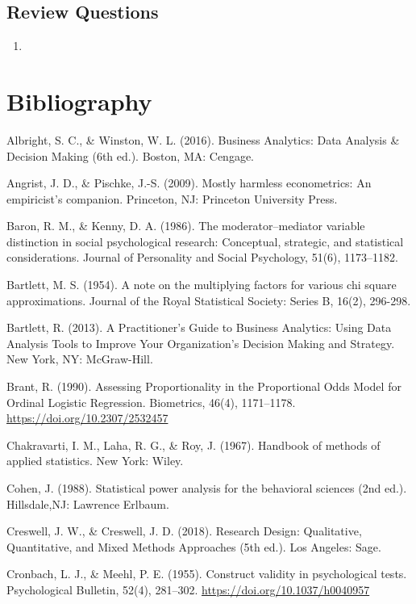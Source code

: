 \documentclass[
]{book}
\providecommand{\tightlist}{%
  \setlength{\itemsep}{0pt}\setlength{\parskip}{0pt}}
\begin{document}
\hypertarget{review-questions-13}{%
\section{Review Questions}\label{review-questions-13}}

\begin{enumerate}
\def\labelenumi{\arabic{enumi}.}
\tightlist
\item
\end{enumerate}

\hypertarget{bibli}{%
\chapter{Bibliography}\label{bibli}}

Albright, S. C., \& Winston, W. L. (2016). Business Analytics: Data Analysis \& Decision Making (6th ed.). Boston, MA: Cengage.

Angrist, J. D., \& Pischke, J.-S. (2009). Mostly harmless econometrics: An empiricist's companion. Princeton, NJ: Princeton University Press.

Baron, R. M., \& Kenny, D. A. (1986). The moderator--mediator variable distinction in social psychological research: Conceptual, strategic, and statistical considerations. Journal of Personality and Social Psychology, 51(6), 1173--1182.

Bartlett, M. S. (1954). A note on the multiplying factors for various chi square approximations. Journal of the Royal Statistical Society: Series B, 16(2), 296-298.

Bartlett, R. (2013). A Practitioner's Guide to Business Analytics: Using Data Analysis Tools to Improve Your Organization's Decision Making and Strategy. New York, NY: McGraw-Hill.

Brant, R. (1990). Assessing Proportionality in the Proportional Odds Model for Ordinal Logistic Regression. Biometrics, 46(4), 1171--1178. \url{https://doi.org/10.2307/2532457}

Chakravarti, I. M., Laha, R. G., \& Roy, J. (1967). Handbook of methods of applied statistics. New York: Wiley.

Cohen, J. (1988). Statistical power analysis for the behavioral sciences (2nd ed.). Hillsdale,NJ: Lawrence Erlbaum.

Creswell, J. W., \& Creswell, J. D. (2018). Research Design: Qualitative, Quantitative, and Mixed Methods Approaches (5th ed.). Los Angeles: Sage.

Cronbach, L. J., \& Meehl, P. E. (1955). Construct validity in psychological tests. Psychological Bulletin, 52(4), 281--302. \url{https://doi.org/10.1037/h0040957}
\end{document}
